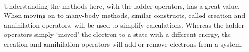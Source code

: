 \paragraph*{}
Understanding the methods here, with the ladder operators, has a great value.
When moving on to many-body methods, similar constructs, called creation and annihilation operators, will be used to simplify calculations.
Whereas the ladder operators simply `moved' the electron to a state with a different energy, the creation and annihilation operators will add or remove electrons from a system.













